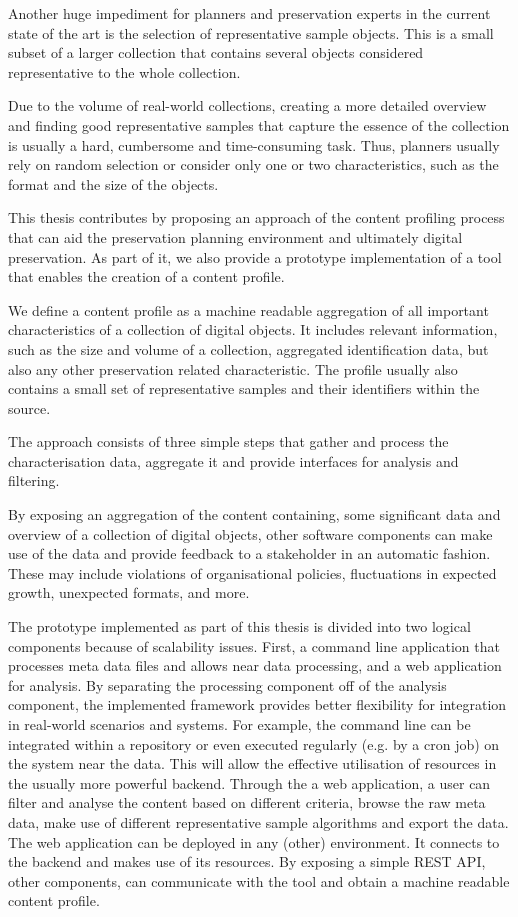 Another huge impediment for planners and preservation experts in the current state of the art is the selection of representative sample objects. This is a small subset of a larger collection that contains several objects considered representative to the whole collection. 

Due to the volume of real-world collections, creating a more detailed overview and finding good representative samples that capture the essence of the collection is usually a hard, cumbersome and time-consuming task.
Thus, planners usually rely on random selection or consider only one or two characteristics, such as the format and the size of the objects.


This thesis contributes by proposing an approach of the content profiling process that can aid the preservation planning environment and ultimately digital preservation. As part of it, we also provide a prototype implementation of a tool that enables the creation of a content profile.

We define a content profile as a machine readable aggregation of all important characteristics of a collection of digital objects. It includes relevant information, such as the size and volume of a collection, aggregated identification data, but also any other preservation related characteristic. The profile usually also contains a small set of representative samples and their identifiers within the source.

The approach consists of three simple steps that gather and process the characterisation data, aggregate it and provide
interfaces for analysis and filtering. 

By exposing an aggregation of the content containing, some significant data and overview of a collection of digital objects, other software components can make use of the data and provide feedback to a stakeholder in an automatic fashion. 
These may include violations of organisational policies, fluctuations in expected growth, unexpected formats, and more.

The prototype implemented as part of this thesis is divided into two logical components because of scalability issues.
First, a command line application that processes meta data files and allows near data processing, and a web application for analysis. By separating the processing component off of the analysis component, the implemented framework provides
better flexibility for integration in real-world scenarios and systems. For example, the command line can be integrated within a repository or even executed regularly (e.g. by a cron job) on the system near the data. This will allow the effective utilisation of resources in the usually more powerful backend.
Through the a web application, a user can filter and analyse the content based on different criteria, browse the raw meta data, make use of different representative sample algorithms and export the data. The web application can be deployed in any (other) environment. It connects to the backend and makes use of its resources. By exposing a simple REST API, other components, can communicate with the tool and obtain a machine readable content profile.
 
